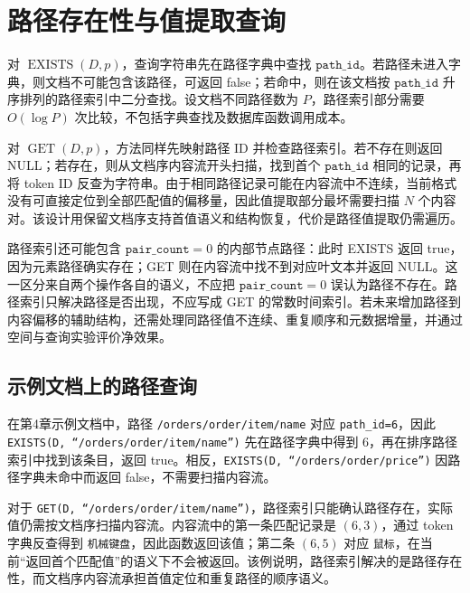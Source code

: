 \section{路径存在性与值提取查询}

对 $\operatorname{EXISTS}(D,p)$，查询字符串先在路径字典中查找 $\texttt{path\_id}$。若路径未进入字典，则文档不可能包含该路径，可返回 false；若命中，则在该文档按 $\texttt{path\_id}$ 升序排列的路径索引中二分查找。设文档不同路径数为 $P$，路径索引部分需要 $O(\log P)$ 次比较，不包括字典查找及数据库函数调用成本。

对 $\operatorname{GET}(D,p)$，方法同样先映射路径 ID 并检查路径索引。若不存在则返回 NULL；若存在，则从文档序内容流开头扫描，找到首个 $\texttt{path\_id}$ 相同的记录，再将 token ID 反查为字符串。由于相同路径记录可能在内容流中不连续，当前格式没有可直接定位到全部匹配值的偏移量，因此值提取部分最坏需要扫描 $N$ 个内容对。该设计用保留文档序支持首值语义和结构恢复，代价是路径值提取仍需遍历。

路径索引还可能包含 $\texttt{pair\_count}=0$ 的内部节点路径：此时 EXISTS 返回 true，因为元素路径确实存在；GET 则在内容流中找不到对应叶文本并返回 NULL。这一区分来自两个操作各自的语义，不应把 $\texttt{pair\_count}=0$ 误认为路径不存在。路径索引只解决路径是否出现，不应写成 GET 的常数时间索引。若未来增加路径到内容偏移的辅助结构，还需处理同路径值不连续、重复顺序和元数据增量，并通过空间与查询实验评价净效果。

\subsection{示例文档上的路径查询}

在第4章示例文档中，路径 \texttt{/orders/order/item/name} 对应 \texttt{path\_id=6}，因此
\texttt{EXISTS(D, ``/orders/order/item/name'')} 先在路径字典中得到 6，再在排序路径索引中找到该条目，返回 true。相反，\texttt{EXISTS(D, ``/orders/order/price'')} 因路径字典未命中而返回 false，不需要扫描内容流。

对于 \texttt{GET(D, ``/orders/order/item/name'')}，路径索引只能确认路径存在，实际值仍需按文档序扫描内容流。内容流中的第一条匹配记录是 $(6,3)$，通过 token 字典反查得到 \texttt{机械键盘}，因此函数返回该值；第二条 $(6,5)$ 对应 \texttt{鼠标}，在当前“返回首个匹配值”的语义下不会被返回。该例说明，路径索引解决的是路径存在性，而文档序内容流承担首值定位和重复路径的顺序语义。

